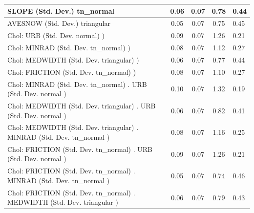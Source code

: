 \begin{table}
\begin{center}
\begin{tabular}{|l|l|c|c|c|l|}
			\hline
			SLOPE (Std. Dev.) tn_normal &  & 0.06 & 0.07 & 0.78 & 0.44 \\
			\hline
			AVESNOW (Std. Dev.) triangular &  & 0.05 & 0.07 & 0.75 & 0.45 \\
			\hline
			 Chol: URB (Std. Dev. normal) ) &  & 0.09 & 0.07 & 1.26 & 0.21 \\
			\hline
			 Chol: MINRAD (Std. Dev. tn_normal) ) &  & 0.08 & 0.07 & 1.12 & 0.27 \\
			\hline
			 Chol: MEDWIDTH (Std. Dev. triangular) ) &  & 0.06 & 0.07 & 0.77 & 0.44 \\
			\hline
			 Chol: FRICTION (Std. Dev. tn_normal) ) &  & 0.08 & 0.07 & 1.10 & 0.27 \\
			\hline
			 Chol: MINRAD (Std. Dev. tn_normal) . URB (Std. Dev.   normal ) &  & 0.10 & 0.07 & 1.32 & 0.19 \\
			\hline
			 Chol: MEDWIDTH (Std. Dev. triangular) . URB (Std. Dev.   normal ) &  & 0.06 & 0.07 & 0.82 & 0.41 \\
			\hline
			 Chol: MEDWIDTH (Std. Dev. triangular) . MINRAD (Std. Dev.   tn_normal ) &  & 0.08 & 0.07 & 1.16 & 0.25 \\
			\hline
			 Chol: FRICTION (Std. Dev. tn_normal) . URB (Std. Dev.   normal ) &  & 0.09 & 0.07 & 1.26 & 0.21 \\
			\hline
			 Chol: FRICTION (Std. Dev. tn_normal) . MINRAD (Std. Dev.   tn_normal ) &  & 0.05 & 0.07 & 0.74 & 0.46 \\
			\hline
			 Chol: FRICTION (Std. Dev. tn_normal) . MEDWIDTH (Std. Dev.   triangular ) &  & 0.06 & 0.07 & 0.79 & 0.43 \\
			\hline
		\end{tabular}
	\end{center}
\end{table}
